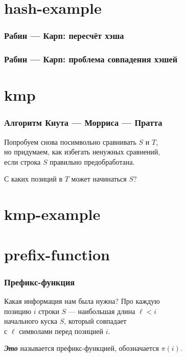 \documentclass[11pt,aspectratio=169,svgnames]{beamer}
\begin{document}
\section{hash-example}

\begin{frame} \frametitle{Рабин — Карп: пересчёт хэша}
  \begin{center} \begin{tikzpicture}[xscale=0.71,yscale=0.87]
    
  \end{tikzpicture} \end{center}
\end{frame}


\begin{frame} \frametitle{Рабин — Карп: проблема совпадения хэшей}
  \begin{center} \begin{tikzpicture}[xscale=0.71,yscale=0.87]
    
  \end{tikzpicture} \end{center}
\end{frame}


\section{kmp}

\begin{frame} \frametitle{Алгоритм Кнута — Морриса — Пратта}
Попробуем снова посимвольно сравнивать \(S\) и \(T\),\\
но придумаем, как избегать ненужных сравнений,\\
если строка \(S\) правильно предобработана.\bigskip \pause

С каких позиций в \(T\) может начинаться \(S\)?
\end{frame}


\section{kmp-example}




\section{prefix-function}

\begin{frame} \frametitle{Префикс-функция}
Какая информация нам была нужна? Про каждую\\
позицию \(i\) строки \(S\) — наибольшая длина \(\ell< i\)\\
начального куска \(S\), который совпадает\\
с \(\ell\) символами перед позицией \(i\). \bigskip

{\itshape\bfseries Это} называется префикс-функцией, обозначается \(π(i)\). \bigskip


\end{frame}
\end{document}

